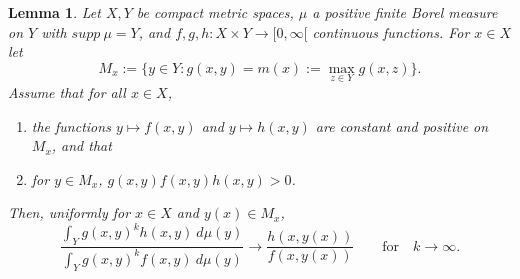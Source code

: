 \documentclass[reqno]{amsart}
\theoremstyle{plain}
\newtheorem{lemma}[theorem]{Lemma}
\theoremstyle{definition}
\numberwithin{equation}{section}
\begin{document}
 
\begin{lemma}\label{Laplace-method-fraction}
  Let $X,Y$ be compact metric spaces, $\mu$ a positive finite Borel measure on $Y$ with $supp\>\mu=Y$,
  and $f,g,h:X\times Y\to[0,\infty[$
      continuous functions. For $x\in X$ let
$$M_x:=\{y\in Y: g(x,y)=m(x):=\max_{z\in Y} g(x,z)\}.$$
Assume that for all $x\in X$,
\begin{enumerate}\itemsep=-1pt
\item[\rm{(1)}] the functions
  $y\mapsto f(x,y)$ and $y\mapsto h(x,y)$ are constant and positive on $M_x$, and that
\item[\rm{(2)}] for $y\in M_x$,  $g(x,y)f(x,y)h(x,y)>0$.
  \end{enumerate}
Then, uniformly for $x\in X$ and $y(x)\in M_x$, 
$$\frac{\int_Y g(x,y)^k h(x,y)\> d\mu(y)}{\int_Y g(x,y)^k f(x,y)\> d\mu(y)} \to  \frac{h(x,y(x))}{f(x,y(x))}
\quad\quad\text{for}\quad k\to\infty. $$
 \end{lemma}
\end{document}
